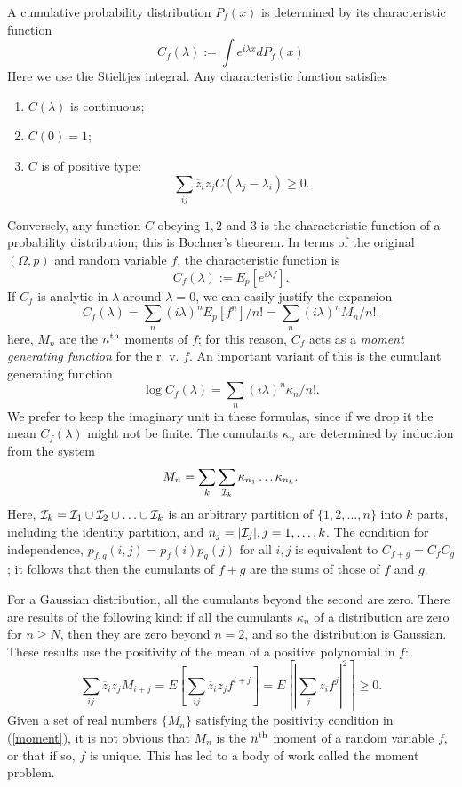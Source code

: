 \documentclass[12pt]{article}
\begin{document}
A cumulative probability distribution $P_f(x)$ is determined by its
characteristic function
\begin{equation}
C_f(\lambda):=\int e^{i\lambda x}dP_f(x)
\end{equation}
Here we use the Stieltjes integral. Any characteristic function satisfies
\begin{enumerate}
\item $C(\lambda)$ is continuous;
\item $C(0)=1$;
\item $C$ is of positive type:
\[\sum_{ij}\overline{z}_iz_jC(\lambda_j-\lambda_i)\geq0.\]
\end{enumerate}
Conversely, any function $C$ obeying $1,2$ and $3$ is the characteristic
function of a probability distribution; this is Bochner's theorem.
In terms of the original $(\Omega,p)$ and random variable $f$, the
characteristic function is
\begin{equation}
C_f(\lambda):=E_p[e^{i\lambda f}].
\end{equation}
If $C_f$ is analytic in $\lambda$ around $\lambda=0$, we can easily
justify the expansion
\[C_f(\lambda)=\sum_n(i\lambda)^nE_p[f^n]/n!=\sum_n(i\lambda)^nM_n/n!.\]
here, $M_n$ are the $n^{\rm th}$ moments of $f$; for this reason,
$C_f$ acts as a {\em moment generating function} for the r. v. $f$.
An important variant of this is the cumulant generating function
\[ \log C_f(\lambda)=\sum_n(i\lambda)^n\kappa_n/n!.\]
We prefer to keep the imaginary unit in these formulas, since if we
drop it the mean $C_f(\lambda)$ might not be finite.
The cumulants $\kappa_n$ are determined by induction from the system
\begin{equation}
M_n=\sum_k\sum_{{\cal I}_k}\kappa_{n_1}\ldots\kappa_{n_k}.
\label{cumulants}
\end{equation}
Here, ${\cal I}_k={\cal I}_1\cup{\cal I}_2\cup\ldots\cup{\cal I}_k$
is an arbitrary partition of $\{1,2,\ldots,n\}$ into $k$ parts,
including the identity partition, and $n_j=|{\cal I}_j|, j=1,\ldots,k$.
The condition for independence, $p_{f,g}(i,j)=p_f(i)p_g(j)$ for all $i,j$ is equivalent to
$C_{f+g}=C_fC_g$; it follows that then the cumulants of $f+g$ are the sums
of those of $f$ and $g$.

For a Gaussian distribution, all the cumulants beyond the second are zero.
There are results of the following kind: if all the cumulants
$\kappa_n$ of a distribution are zero for $n\geq N$, then they are zero
beyond $n=2$, and so the distribution is Gaussian.
These results use the positivity of the mean of a positive polynomial in $f$:
\begin{equation}
\sum_{ij}\overline{z}_iz_jM_{i+j}=E[\sum_{ij}\overline{z}_iz_jf^{i+j}]=
E[|\sum_jz_if^j|^2]\geq0.
\label{moment}
\end{equation}
Given a set of real numbers $\{M_n\}$ satisfying the positivity condition in
(\ref{moment}), it is
not obvious that $M_n$ is the $n^{\rm th}$ moment of a random variable $f$,
or that if so, $f$ is unique.
This has led to a body of work called the moment problem.
\end{document}
